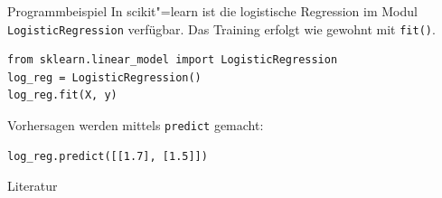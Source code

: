 \documentclass[a4paper, 10pt, twocolumn]{scrartcl}
\newcommand{\spacer}{\vfill}
\begin{document}
\begin{block}{Programmbeispiel}
In scikit"=learn ist die logistische Regression im Modul \lstinline{LogisticRegression} verfügbar. Das Training erfolgt wie gewohnt mit \lstinline{fit()}.

\begin{lstlisting}
from sklearn.linear_model import LogisticRegression
log_reg = LogisticRegression()
log_reg.fit(X, y)
\end{lstlisting}

Vorhersagen werden mittels \lstinline{predict} gemacht:

\begin{lstlisting}
log_reg.predict([[1.7], [1.5]])
\end{lstlisting}
\end{block}

\spacer

\nocite{*} %
\begin{block}{Literatur}
\printbibliography[heading=none]
\end{block}

\spacer
\end{document}
